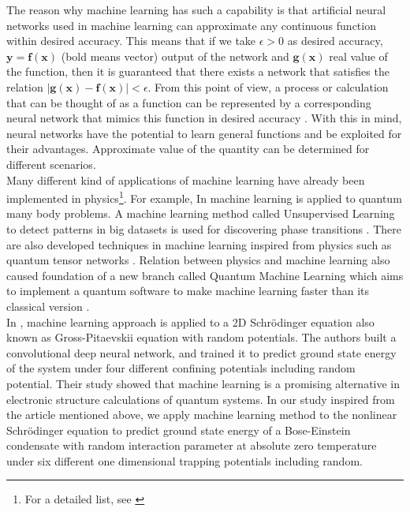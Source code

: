 \documentclass[a4paper,times,hidelinks,12pt]{article}
\begin{document}
The reason why machine learning has such a capability is that artificial neural networks used in machine learning can approximate any continuous function within desired accuracy. This means that if we take $\epsilon > 0$ as desired accuracy,  $\boldsymbol{y} = \boldsymbol{f}(\boldsymbol{x})$ (bold means vector) output of the network and $\boldsymbol{g}(\boldsymbol{x})$ real value of the function, then it is guaranteed that there exists a network that satisfies the relation $|\boldsymbol{g}(\boldsymbol{x}) - \boldsymbol{f}(\boldsymbol{x})| < \epsilon $. From this point of view, a process or calculation that can be thought of as a function can be represented by a corresponding neural network that mimics this function in desired accuracy \cite{nielsen2015neural}. With this in mind, neural networks have the potential to learn general functions and be exploited for their advantages. Approximate value of the quantity can be determined for different scenarios. \\

Many different kind of applications of machine learning have already been implemented in physics\footnote{For a detailed list, see \cite{physicsml}}. For example, In \cite{carleo2017solving, cai2017approximating} machine learning is applied to quantum many body problems. A machine learning method called Unsupervised Learning to detect patterns in big datasets is used for discovering phase transitions \cite{wang2016discovering}. There are also developed techniques in machine learning inspired from physics such as quantum tensor networks \cite{stoudenmire2016supervised}. Relation between physics and machine learning also caused foundation of a new branch called Quantum Machine Learning which aims to implement a quantum software to make machine learning faster than its classical version \cite{biamonte1611quantum}. \\

In \cite{mills2017deep}, machine learning approach is applied to a 2D Schr{\"o}dinger equation also known as Gross-Pitaevskii equation with random potentials. The authors built a convolutional deep neural network, and trained it to predict ground state energy of the system under four different confining potentials including random potential. Their study showed that machine learning is a promising alternative in electronic structure calculations of quantum systems. In our study inspired from the article mentioned above, we apply machine learning method to the nonlinear Schr{\"o}dinger equation to predict ground state energy of a Bose-Einstein condensate with random interaction parameter at absolute zero temperature under six different one dimensional trapping potentials including random. 
\end{document}
